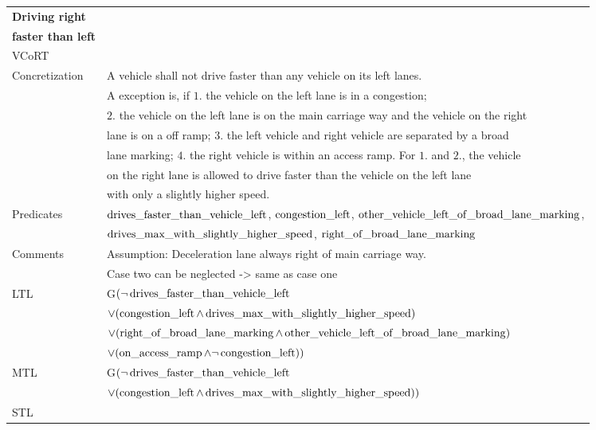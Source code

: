 \begin{table}[H]
	\centering
	\begin{tabular}[t]{ll}
		\toprule
		\textbf{Driving right} & \\
		\textbf{faster than left} &\\
		\midrule
		VCoRT  &  \\
		
		Concretization &  A vehicle shall not drive faster than any vehicle on its left lanes. \\
		& A exception is, if $1.$ the vehicle on the left lane is in a congestion; \\
		& $2.$ the vehicle on the left lane is on the main carriage way and the vehicle on the right \\
		& lane is on a off ramp; $3.$ the left vehicle and right vehicle are separated by a broad \\
		& lane marking;  $4.$ the right vehicle is within an access ramp. For $1.$ and $2.$, the vehicle \\ 
		& on the right lane is allowed to drive faster than the vehicle on the left lane \\
		& with only a slightly higher speed.\\
		
		Predicates & $\operatorname*{drives\_faster\_than\_vehicle\_left}$, $\operatorname*{congestion\_left}$, $\operatorname*{other\_vehicle\_left\_of\_broad\_lane\_marking}$,\\
		& $\operatorname*{drives\_max\_with\_slightly\_higher\_speed}$, $\operatorname*{right\_of\_broad\_lane\_marking}$\\
		
		Comments &  Assumption: Deceleration lane always right of main carriage way.\\
		& Case two can be neglected -> same as case one \\
		
		LTL & G$(\neg \operatorname*{drives\_faster\_than\_vehicle\_left}$ \\ 
		& $\lor (\operatorname*{congestion\_left} \land \operatorname*{drives\_max\_with\_slightly\_higher\_speed})$\\
		& $\lor (\operatorname*{right\_of\_broad\_lane\_marking} \land \operatorname*{other\_vehicle\_left\_of\_broad\_lane\_marking})$\\
		& $\lor (\operatorname*{on\_access\_ramp} \land \neg \operatorname*{congestion\_left}))$\\
		MTL & G$(\neg \operatorname*{drives\_faster\_than\_vehicle\_left}$ \\ 
		& $\lor (\operatorname*{congestion\_left} \land \operatorname*{drives\_max\_with\_slightly\_higher\_speed}))$\\
		STL & \\
		\bottomrule
	\end{tabular}
\end{table}


